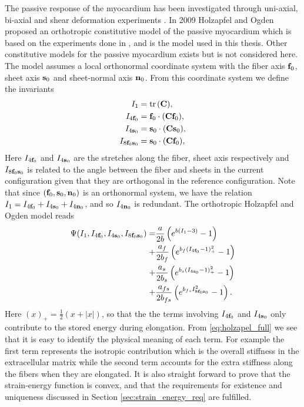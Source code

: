 The passive response of the myocardium has been investigated through
uni-axial, bi-axial and shear deformation experiments \cite{dokos2002shear}.
In 2009 Holzapfel and Ogden proposed an orthotropic constitutive model
of the passive myocardium \cite{holzapfel2009constitutive} which is
based on the experiments done in \cite{dokos2002shear}, and is the
model used in this thesis. Other constitutive models for the passive
myocardium exists
\cite{costa2001modelling,guccione1991passive,nash2000computational}
but is not considered here. The model
assumes a local orthonormal coordinate system with the fiber axis
$\mathbf{f}_0$, sheet axis $\mathbf{s}_0$ and sheet-normal axis $\mathbf{n}_0$. %
From this coordinate system we define the invariants
\begin{align}
  \begin{split}
    I_1 &= \mathrm{tr} \hspace{0.05cm}(\mathbf{C}) ,\\
    I_{4\mathbf{f}_0} &= \mathbf{f}_0 \cdot (\mathbf{C} \mathbf{f}_0),\\
    I_{4\mathbf{s}_0} &= \mathbf{s}_0 \cdot (\mathbf{C} \mathbf{s}_0),\\
    I_{8\mathbf{f}_0\mathbf{s}_0} &=  \mathbf{s}_0 \cdot (\mathbf{C} \mathbf{f}_0), 
  \end{split}
\end{align}
Here $I_{4\mathbf{f}_0} $ and $I_{4\mathbf{s}_0}$ are the stretches along the
fiber, sheet axis respectively and $I_{8\mathbf{f}_0\mathbf{s}_0}$ is
related to the angle between the fiber and sheets in the current
configuration given that they are orthogonal in the reference
configuration. Note that since $(\mathbf{f}_0, \mathbf{s}_0, \mathbf{n}_0)$ is an orthonormal
system, we have the relation $I_1 = I_{4\mathbf{f}_0} + I_{4\mathbf{s}_0} +I_{4\mathbf{n}_0}$,
and so $I_{4\mathbf{n}_0}$ is redundant. The orthotropic Holzapfel and Ogden
model reads
\begin{align}
  \label{eq:holzapel_full}
  \begin{split}
  \Psi(I_1, I_{4\mathbf{f}_0},  I_{4\mathbf{s}_0},  I_{8\mathbf{f}_0\mathbf{s}_0}) =& \frac{a}{2 b} \left( e^{ b (I_1 - 3)}  -1 \right)\\
  +& \frac{a_f}{2 b_f} \left( e^{ b_f (I_{4\mathbf{f}_0} - 1)_+^2} -1 \right) \\
  +& \frac{a_s}{2 b_s} \left( e^{ b_s (I_{4\mathbf{s}_0} - 1)_+^2} -1 \right)\\
  +& \frac{a_{fs}}{2 b_{fs}} \left( e^{ b_{fs} I_{8\mathbf{f}_0\mathbf{s}_0}^2} -1 \right).
\end{split}
\end{align}
Here $( x )_+ = \frac{1}{2} \left( x + |x| \right)$, so that the
the terms involving $I_{4\mathbf{f}_0}$ and $I_{4\mathbf{s}_0}$ only contribute to the
stored energy during elongation. From \eqref{eq:holzapel_full} we see
that it is easy to identify the physical meaning of each term. For
example the first term represents the isotropic contribution which is
the overall stiffness in the extracellular matrix while the second
term accounts for the extra stiffness along the fibers when they are
elongated. It is also straight forward to prove that the strain-energy
function is convex, and that the requirements for existence and
uniqueness discussed in Section \ref{sec:strain_energy_req} are
fulfilled.


